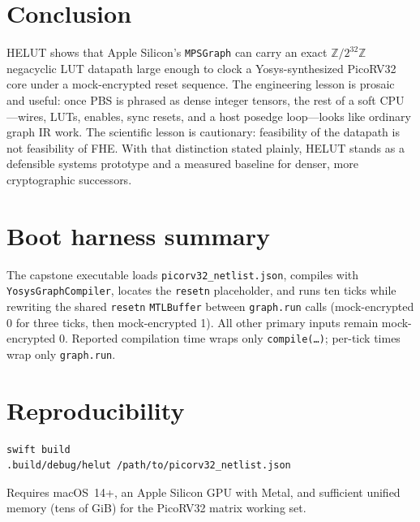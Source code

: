 \documentclass[11pt,a4paper]{article}
\begin{document}
\section{Conclusion}
\label{sec:conclusion}

HELUT shows that Apple Silicon's \texttt{MPSGraph} can carry an exact
$\mathbb{Z}/2^{32}\mathbb{Z}$ negacyclic LUT datapath large enough to clock a
Yosys-synthesized PicoRV32 core under a mock-encrypted reset sequence.
The engineering lesson is prosaic and useful: once PBS is phrased as dense
integer tensors, the rest of a soft CPU---wires, LUTs, enables, sync resets,
and a host posedge loop---looks like ordinary graph IR work.
The scientific lesson is cautionary: feasibility of the datapath is not
feasibility of FHE.
With that distinction stated plainly, HELUT stands as a defensible systems
prototype and a measured baseline for denser, more cryptographic successors.

\appendix
\section{Boot harness summary}
\label{app:boot}

The capstone executable loads \texttt{picorv32\_netlist.json}, compiles with
\texttt{YosysGraphCompiler}, locates the \texttt{resetn} placeholder, and runs
ten ticks while rewriting the shared \texttt{resetn} \texttt{MTLBuffer} between
\texttt{graph.run} calls (mock-encrypted 0 for three ticks, then mock-encrypted 1).
All other primary inputs remain mock-encrypted 0.
Reported compilation time wraps only \texttt{compile(\ldots)}; per-tick times wrap
only \texttt{graph.run}.

\section{Reproducibility}
\label{app:repro}

\begin{lstlisting}
swift build
.build/debug/helut /path/to/picorv32_netlist.json
\end{lstlisting}
Requires macOS~14+, an Apple Silicon GPU with Metal, and sufficient unified
memory (tens of GiB) for the PicoRV32 matrix working set.
\end{document}
